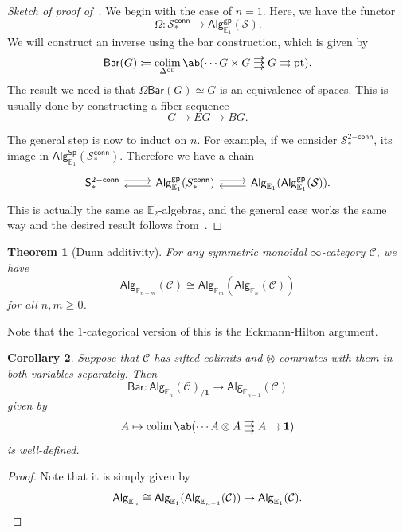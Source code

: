 \documentclass[10pt, oneside]{memoir}
\newtheorem{thm}{Theorem}[subsection]
\newtheorem{cor}[thm]{Corollary}
\theoremstyle{definition}
\theoremstyle{remark}
\theoremstyle{plain}
\theoremstyle{definition}
\theoremstyle{remark}
\newcommand{\E}{\mathbb{E}}
\newcommand{\mc}[1]{\mathcal{#1}}
\newcommand{\mr}[1]{\mathrm{#1}}
\newcommand{\ms}[1]{\mathsf{#1}}
\newcommand{\1}{\mathbf{1}}
\newcommand{\2}{\mathbf{2}}
\newcommand{\3}{\mathbf{3}}
\newcommand{\pt}{\mr{pt}}
\newcommand*{\triple}[2][.1ex]{%
    \mathrel{\vcenter{\offinterlineskip%
    \hbox{\(#2 \)}\vskip#1\hbox{\(#2 \)}\vskip#1\hbox{\(#2 \)}}}}
\DeclareMathOperator{\op}{op}
\DeclareMathOperator*{\colim}{colim}
\begin{document}
\begin{proof}[Sketch of proof of~]
    We begin with the case of \(n=1 \). Here, we have the functor
    \[ \Omega \colon \mc{S}_*^{\ms{conn}} \to \ms{Alg}_{\E_1}^{\ms{gp}}(\mc{S}). \]
    We will construct an inverse using the bar construction, which is given by
    \[ \ms{Bar}(G) \coloneqq \colim_{\Delta^{\op}} \ab(\cdots G \times G \triple{\to} G \rightrightarrows \pt). \]
    The result we need is that \(\Omega \ms{Bar}(G) \simeq G \) is an equivalence of spaces. This is usually done by constructing a fiber sequence
    \[ G \to EG \to BG. \]

    The general step is now to induct on \(n \). For example, if we consider \(\mc{S}_*^{2\ms{-conn}} \), its image in \(\ms{Alg}_{\E_1}^{\ms{Sp}}(\mc{S}_*^{\ms{conn}}) \). Therefore we have a chain
    \begin{equation*}
    \begin{tikzcd}
        \ms{S}_*^{2\ms{-conn}} \ar[shift left=1]{r} & \ms{Alg}_{\E_1}^{\ms{gp}} (S_*^{\ms{conn}})\ar[shift left=1]{r} \ar[shift left=1]{l} & \ms{Alg}_{\E_1}(\ms{Alg}_{\E_1}^{\ms{gp}}(\mc{S})). \ar[shift left=1]{l}
    \end{tikzcd}
    \end{equation*}
    This is actually the same as \(\E_2 \)-algebras, and the general case works the same way and the desired result follows from~.
\end{proof}

\begin{thm}[Dunn additivity]\label{thm:dunnadditivity}
    For any symmetric monoidal \(\infty \)-category \(\mc{C} \), we have
    \[ \ms{Alg}_{\E_{n+m}}(\mc{C}) \cong \ms{Alg}_{\E_m}(\ms{Alg}_{\E_n}(\mc{C})) \]
    for all \(n, m \geq 0 \).
\end{thm}

Note that the \(1 \)-categorical version of this is the Eckmann-Hilton argument.

\begin{cor}
    Suppose that \(\mc{C} \) has sifted colimits and \(\otimes \) commutes with them in both variables separately. Then
    \[ \ms{Bar} \colon \ms{Alg}_{\E_n}(\mc{C})_{/\1} \to \ms{Alg}_{\E_{n-1}}(\mc{C}) \]
    given by 
    \[ A \mapsto \colim \ab(\cdots A \otimes A \triple{\to} A \rightrightarrows \1) \]
    is well-defined.
\end{cor}

\begin{proof}
    Note that it is simply given by
    \[ \ms{Alg}_{\E_n} \cong \ms{Alg}_{\E_1} (\ms{Alg}_{\E_{n-1}}(\mc{C})) \to \ms{Alg}_{\E_1}(\mc{C}). \qedhere \]
\end{proof}
\end{document}
